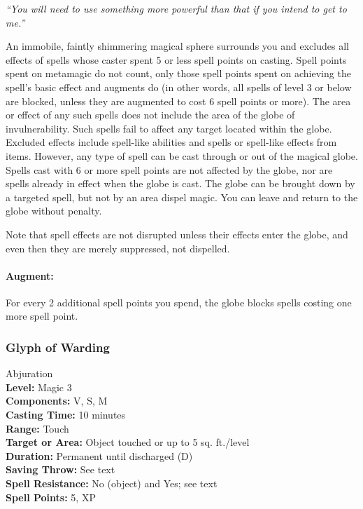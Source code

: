 \emph{``You will need to use something more powerful than that if you intend to get to me.''}

An immobile, faintly shimmering magical sphere surrounds you and excludes all effects of spells whose caster spent 
5 or less spell points on casting. Spell points spent on metamagic do not count, only those spell points
spent on achieving the spell's basic effect and augments do 
(in other words, all spells of level 3 or below are blocked, unless they are augmented to cost 6 spell points or more).
The area or effect of any such spells does not include the area of the globe of invulnerability. 
Such spells fail to affect any target located within the globe. 
Excluded effects include spell-like abilities and spells or spell-like effects from items.
However, any type of spell can be cast through or out of the magical globe.
Spells cast with 6 or more spell points are not affected by the globe, nor are spells already in effect when the globe is cast.
The globe can be brought down by a targeted  spell, but not by an area dispel magic.
You can leave and return to the globe without penalty.

Note that spell effects are not disrupted unless their effects enter the globe, and even then they are merely suppressed, not dispelled.


\paragraph{Augment:} For every 2 additional spell points you spend, the globe blocks spells costing one more spell point.

\subsubsection{Glyph of Warding}
\label{Spell:GlyphOfWarding}
Abjuration
\\ \textbf{Level:} Magic 3
\\ \textbf{Components:} V, S, M
\\ \textbf{Casting Time:} 10 minutes
\\ \textbf{Range:} Touch
\\ \textbf{Target or Area:} Object touched or up to 5 sq. ft./level
\\ \textbf{Duration:} Permanent until discharged (D)
\\ \textbf{Saving Throw:} See text
\\ \textbf{Spell Resistance:} No (object) and Yes; see text
\\ \textbf{Spell Points:} 5, XP

